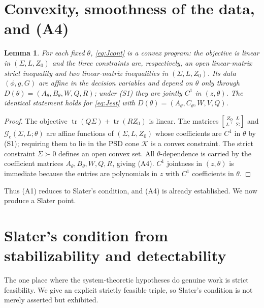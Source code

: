 \documentclass[11pt]{article}
\newtheorem{lemma}{Lemma}
\theoremstyle{definition}
\DeclareMathOperator{\tr}{tr}
\newcommand{\Th}{\theta}
\newcommand{\Sig}{\Sigma}
\begin{document}
\section{Convexity, smoothness of the data, and (A4)}\label{sec:convex}

\begin{lemma}\label{lem:convex}
For each fixed $\Th$, \eqref{eq:Jcont} is a convex program: the objective is
linear in $(\Sig,L,Z_0)$ and the three constraints are, respectively, an open
linear-matrix strict inequality and two linear-matrix inequalities in
$(\Sig,L,Z_0)$. Its data $(\phi,g,G)$ are affine in the decision variables and
depend on $\Th$ only through $D(\Th)=(A_\Th,B_\Th,W,Q,R)$; under \textup{(S1)}
they are jointly $C^1$ in $(z,\Th)$. The identical statement holds for
\eqref{eq:Jest} with $D(\Th)=(A_\Th,C_\Th,W,V,Q)$.
\end{lemma}

\begin{proof}
The objective $\tr(Q\Sig)+\tr(RZ_0)$ is linear. The matrices
$\begin{bsmallmatrix}Z_0&L\\L^\top&\Sig\end{bsmallmatrix}$ and
$\mathcal G_{\mathrm c}(\Sig,L;\Th)$ are affine functions of $(\Sig,L,Z_0)$
whose coefficients are $C^1$ in $\Th$ by (S1); requiring them to lie in the PSD
cone $\mathcal K$ is a convex constraint. The strict constraint $\Sig\succ0$
defines an open convex set. All $\Th$-dependence is carried by the coefficient
matrices $A_\Th,B_\Th,W,Q,R$, giving (A4). $C^1$ jointness in $(z,\Th)$ is
immediate because the entries are polynomials in $z$ with $C^1$ coefficients in
$\Th$.
\end{proof}

Thus (A1) reduces to Slater's condition, and (A4) is already established. We now
produce a Slater point.

\section{Slater's condition from stabilizability and detectability}\label{sec:slater}

The one place where the system-theoretic hypotheses do genuine work is strict
feasibility. We give an explicit strictly feasible triple, so Slater's condition
is not merely asserted but exhibited.
\end{document}

